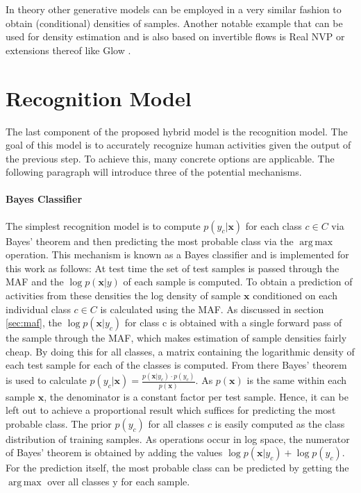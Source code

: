 \documentclass[11pt,titlepage,oneside,openany]{book}
\DeclareMathOperator*{\argmax}{arg\,max}
\begin{document}
In theory other generative models can be employed in a very similar fashion to obtain (conditional) densities of samples. Another notable example that can be used for density estimation and is also based on invertible flows is Real NVP \cite{dinh_density_2017} or extensions thereof like Glow \cite{kingma_glow_2018}.

\section{Recognition Model}
The last component of the proposed hybrid model is the recognition model. The goal of this model is to accurately recognize human activities given the output of the previous step. To achieve this, many concrete options are applicable. The following paragraph will introduce three of the potential mechanisms.

\paragraph{Bayes Classifier}
The simplest recognition model is to compute $p(y_c|\pmb{x})$ for each class $c \in C$ via Bayes' theorem and then predicting the most probable class via the $\argmax$ operation. This mechanism is known as a Bayes classifier and is implemented for this work as follows: At test time the set of test samples is passed through the MAF and the $\log p(\pmb{x}|y)$ of each sample is computed. To obtain a prediction of activities from these densities the log density of sample $\pmb{x}$ conditioned on each individual class $c \in C$ is calculated using the MAF. As discussed in section \ref{sec:maf}, the $\log p(\pmb{x}|y_c)$ for class c is obtained with a single forward pass of the sample through the MAF, which makes estimation of sample densities fairly cheap. By doing this for all classes, a matrix containing the logarithmic density of each test sample for each of the classes is computed. From there Bayes' theorem is used to calculate $p(y_c|\pmb{x}) = \frac{p(\pmb{x}|y_c) \cdot p(y_c)}{p(\pmb{x})}$. As $p(\pmb{x})$ is the same within each sample $\pmb{x}$, the denominator is a constant factor per test sample. Hence, it can be left out to achieve a proportional result which suffices for predicting the most probable class. The prior $p(y_c)$ for all classes $c$ is easily computed as the class distribution of training samples. As operations occur in log space, the numerator of Bayes' theorem is obtained by adding the values $\log p(\pmb{x}|y_c) + \log p(y_c)$. For the prediction itself, the most probable class can be predicted by getting the $\argmax$ over all classes y for each sample.
\end{document}
